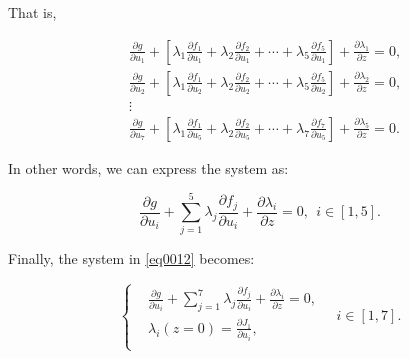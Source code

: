 \documentclass[11pt]{article}
\begin{document}
\begin{enumerate}
	That is,  
	
	\begin{equation}
		\begin{split}
			& \frac{{\partial g}}{{\partial {u_1}}} + \left[ {{\lambda _1}\frac{{\partial {f_1}}}{{\partial {u_1}}} + {\lambda _2}\frac{{\partial {f_2}}}{{\partial {u_1}}} +  \cdots  + {\lambda _5}\frac{{\partial {f_5}}}{{\partial {u_1}}}} \right] + \frac{{\partial {\lambda _1}}}{{\partial z}} = 0,\\
			& \frac{{\partial g}}{{\partial {u_2}}} + \left[ {{\lambda _1}\frac{{\partial {f_1}}}{{\partial {u_2}}} + {\lambda _2}\frac{{\partial {f_2}}}{{\partial {u_2}}} +  \cdots  + {\lambda _5}\frac{{\partial {f_5}}}{{\partial {u_2}}}} \right] + \frac{{\partial {\lambda _2}}}{{\partial z}} = 0,\\
			& \vdots \\
			& \frac{{\partial g}}{{\partial {u_7}}} + \left[ {{\lambda _1}\frac{{\partial {f_1}}}{{\partial {u_5}}} + {\lambda _2}\frac{{\partial {f_2}}}{{\partial {u_5}}} +  \cdots  + {\lambda _7}\frac{{\partial {f_7}}}{{\partial {u_5}}}} \right] + \frac{{\partial {\lambda _5}}}{{\partial z}} = 0.
		\end{split}
	\end{equation}
	
	In other words, we can express the system as:
	
	\begin{equation}
		\frac{{\partial g}}{{\partial {u_i}}} + \sum\limits_{j = 1}^5 {{\lambda _j}\frac{{\partial {f_j}}}{{\partial {u_i}}}}  + \frac{{\partial {\lambda _i}}}{{\partial z}} = 0,\ \ i \in \left[ {1,5} \right].
	\end{equation}
	
	Finally, the system in \eqref{eq0012} becomes:
	
	\begin{equation}
		\left\{
		\begin{aligned}
			& \frac{{\partial g}}{{\partial {u_i}}} + \sum\limits_{j = 1}^7 {{\lambda _j}\frac{{\partial {f_j}}}{{\partial {u_i}}}}  + \frac{{\partial {\lambda _i}}}{{\partial z}} = 0, \\
			& {\lambda _i}\left( {z = 0} \right) = \frac{{\partial {J_1}}}{{\partial {u_i}}}, \\
		\end{aligned}
		\right.
		\quad i \in \left[ {1,7} \right].
	\end{equation}
	

\end{enumerate}
\end{document}
